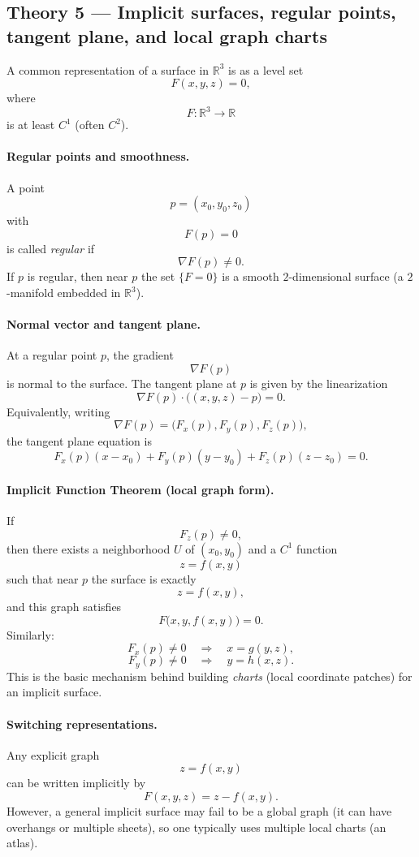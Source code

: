 \documentclass[12pt,a4paper]{article}
\theoremstyle{plain}
\theoremstyle{definition}      %
\begin{document}
\subsection*{Theory 5 — Implicit surfaces, regular points, tangent plane, and local graph charts}

A common representation of a surface in $\mathbb{R}^3$ is as a level set
\[
F(x,y,z)=0,
\]
where
\[
F:\mathbb{R}^3\to\mathbb{R}
\]
is at least $C^1$ (often $C^2$).

\paragraph{Regular points and smoothness.}
A point
\[
p=(x_0,y_0,z_0)
\]
with
\[
F(p)=0
\]
is called \emph{regular} if
\[
\nabla F(p)\neq 0.
\]
If $p$ is regular, then near $p$ the set $\{F=0\}$ is a smooth $2$-dimensional surface (a $2$-manifold embedded in $\mathbb{R}^3$).

\paragraph{Normal vector and tangent plane.}
At a regular point $p$, the gradient
\[
\nabla F(p)
\]
is normal to the surface. The tangent plane at $p$ is given by the linearization
\[
\nabla F(p)\cdot \bigl((x,y,z)-p\bigr)=0.
\]
Equivalently, writing
\[
\nabla F(p)=\bigl(F_x(p),F_y(p),F_z(p)\bigr),
\]
the tangent plane equation is
\[
F_x(p)(x-x_0)+F_y(p)(y-y_0)+F_z(p)(z-z_0)=0.
\]

\paragraph{Implicit Function Theorem (local graph form).}
If
\[
F_z(p)\neq 0,
\]
then there exists a neighborhood $U$ of $(x_0,y_0)$ and a $C^1$ function
\[
z=f(x,y)
\]
such that near $p$ the surface is exactly
\[
z=f(x,y),
\]
and this graph satisfies
\[
F\bigl(x,y,f(x,y)\bigr)=0.
\]
Similarly:
\[
F_x(p)\neq 0
\quad\Rightarrow\quad
x=g(y,z),
\]
\[
F_y(p)\neq 0
\quad\Rightarrow\quad
y=h(x,z).
\]
This is the basic mechanism behind building \emph{charts} (local coordinate patches) for an implicit surface.

\paragraph{Switching representations.}
Any explicit graph
\[
z=f(x,y)
\]
can be written implicitly by
\[
F(x,y,z)=z-f(x,y).
\]
However, a general implicit surface may fail to be a global graph (it can have overhangs or multiple sheets), so one typically uses multiple local charts (an atlas).
\end{document}
